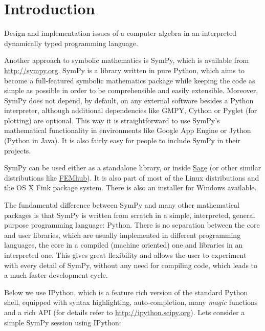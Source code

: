 
\chapter{Introduction}\label{thesis-introduction}

Design and implementation issues of a computer algebra in an interpreted dynamically typed programming language.

\cite{Ulmer1996kovacic}
\cite{Frink2001large}
\cite{Wang1976teaching}

Another approach to symbolic mathematics is SymPy, which is available
from \href{http://sympy.org}{http://sympy.org}.  SymPy is a library written in pure Python,
which aims to become a full-featured symbolic mathematics package
while keeping the code as simple as possible in order to be
comprehensible and easily extensible. Moreover, SymPy does not depend,
by default, on any external software besides a Python interpreter,
although additional dependencies like GMPY, Cython or Pyglet (for
plotting) are optional. This way it is straightforward to use SymPy's
mathematical functionality in environments like Google App Engine or
Jython (Python in Java). It is also fairly easy for people to include
SymPy in their projects.

SymPy can be used either as a standalone library, or inside \href{http://sagemath.org/}{Sage} (or other similar distributions like \href{http://femhub.org/}{FEMhub}). It is also part of most of the Linux
distributions and the OS X Fink package system. There is also an
installer for Windows available.

The fundamental difference between SymPy and many other mathematical
packages is that SymPy is written from scratch in a simple,
interpreted, general purpose programming language: Python.  There is
no separation between the core and user libraries, which are usually
implemented in different programming languages, the core in a compiled
(machine oriented) one and libraries in an interpreted one. This gives
great flexibility and allows the user to experiment with every detail
of SymPy, without any need for compiling code, which leads to a much
faster development cycle.

Below we use IPython, which is a feature rich version of the standard
Python shell, equipped with syntax highlighting, auto-completion, many
\emph{magic} functions and a rich API (for details refer to
\href{http://ipython.scipy.org}{http://ipython.scipy.org}). Lets consider a simple SymPy session using
IPython:

